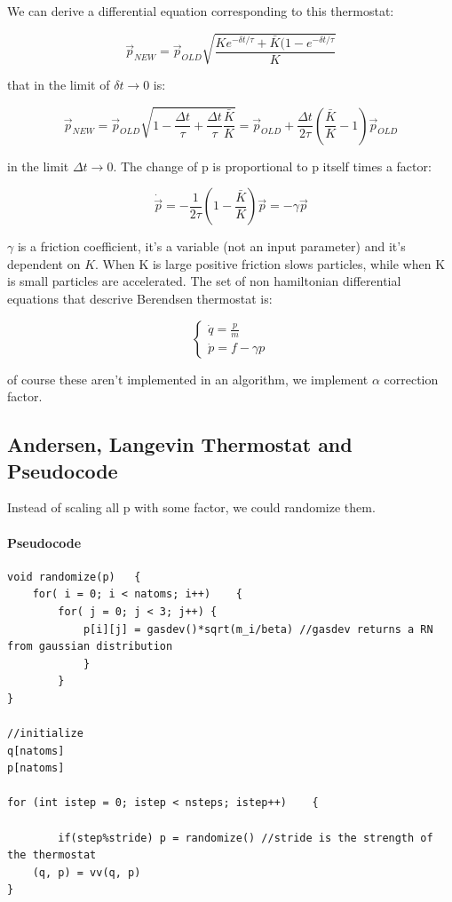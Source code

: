\documentclass[a4paper, italian, openany]{book}
\begin{document}
\medskip

We can derive a differential equation corresponding to this thermostat:

$$\overrightarrow{p}_{NEW} = \overrightarrow{p}_{OLD} \sqrt{\frac{Ke^{-\delta t/\tau} + \bar{K} (1-e^{-\delta t/\tau} }{K}}$$

that in the limit of $\delta t \to 0$ is:

$$\overrightarrow{p}_{NEW} = \overrightarrow{p}_{OLD} \sqrt{1- \frac{\Delta t}{\tau} + \frac{\Delta t}{\tau}\frac{\bar{K}}{K}} = \overrightarrow{p}_{OLD} + \frac{\Delta t}{2 \tau} \left( \frac{\bar{K}}{K} -1 \right ) \overrightarrow{p}_{OLD}$$

in the limit $\Delta t \to 0$. The change of p is proportional to p itself times a factor:

$$\dot{\overrightarrow{p}} = -\frac{1}{2\tau} \left ( 1 - \frac{\bar{K}}{K} \right ) \overrightarrow{p} = -\gamma \overrightarrow{p}$$

$\gamma$ is a friction coefficient, it's a variable (not an input parameter) and it's dependent on $K$. When K is large positive friction slows particles, while when K is small particles are accelerated. The set of non hamiltonian differential equations that descrive Berendsen thermostat is:

$$\begin{cases}
\dot{q} = \frac{p}{m} \\
\dot{p} = f - \gamma p
\end{cases}$$

of course these aren't implemented in an algorithm, we implement $\alpha$ correction factor.

\subsection{Andersen, Langevin Thermostat and Pseudocode}

Instead of scaling all p with some factor, we could randomize them.

\paragraph{Pseudocode}

\begin{lstlisting}
void randomize(p)	{
	for( i = 0; i < natoms; i++)	{
		for( j = 0; j < 3; j++)	{
			p[i][j] = gasdev()*sqrt(m_i/beta) //gasdev returns a RN from gaussian distribution
			}
		}
}

//initialize
q[natoms]
p[natoms]

for (int istep = 0; istep < nsteps; istep++)	{
	
		if(step%stride)	p = randomize() //stride is the strength of the thermostat
	(q, p) = vv(q, p)
}
\end{lstlisting}
\end{document}
